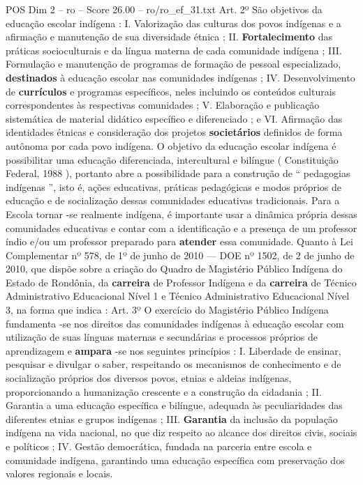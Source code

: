 \begin{textsample}{POS Dim 2 – ro – Score 26.00 – ro/ro\_ef\_31.txt}
Art. 2º São objetivos da educação escolar indígena : I.
Valorização das culturas dos povos indígenas e a afirmação e manutenção de sua diversidade étnica ; II. \textbf{Fortalecimento} das práticas socioculturais e da língua materna de cada comunidade indígena ; III.
Formulação e manutenção de programas de formação de pessoal especializado, \textbf{destinados} à educação escolar nas comunidades indígenas ; IV.
Desenvolvimento de \textbf{currículos} e programas específicos, neles incluindo os conteúdos culturais correspondentes às respectivas comunidades ; V.
Elaboração e publicação sistemática de material didático específico e diferenciado ; e VI.
Afirmação das identidades étnicas e consideração dos projetos \textbf{societários} definidos de forma autônoma por cada povo indígena.
O objetivo da educação escolar indígena é possibilitar uma educação diferenciada, intercultural e bilíngue ( Constituição Federal, 1988 ), portanto abre a possibilidade para a construção de “ pedagogias indígenas ”, isto é, ações educativas, práticas pedagógicas e modos próprios de educação e de socialização dessas comunidades educativas tradicionais.
Para a Escola tornar -se realmente indígena, é importante usar a dinâmica própria dessas comunidades educativas e contar com a identificação e a presença de um professor índio e/ou um professor preparado para \textbf{atender} essa comunidade.
Quanto à Lei Complementar nº 578, de 1º de junho de 2010 — DOE nº 1502, de 2 de junho de 2010, que dispõe sobre a criação do Quadro de Magistério Público Indígena do Estado de Rondônia, da \textbf{carreira} de Professor Indígena e da \textbf{carreira} de Técnico Administrativo Educacional Nível 1 e Técnico Administrativo Educacional Nível 3, na forma que indica : Art. 3º O exercício do Magistério Público Indígena fundamenta -se nos direitos das comunidades indígenas à educação escolar com utilização de suas línguas maternas e secundárias e processos próprios de aprendizagem e \textbf{ampara} -se nos seguintes princípios : I.
Liberdade de ensinar, pesquisar e divulgar o saber, respeitando os mecanismos de conhecimento e de socialização próprios dos diversos povos, etnias e aldeias indígenas, proporcionando a humanização crescente e a construção da cidadania ; II.
Garantia a uma educação específica e bilíngue, adequada às peculiaridades das diferentes etnias e grupos indígenas ; III. \textbf{Garantia} da inclusão da população indígena na vida nacional, no que diz respeito ao alcance dos direitos civis, sociais e políticos ; IV.
Gestão democrática, fundada na parceria entre escola e comunidade indígena, garantindo uma educação específica com preservação dos valores regionais e locais.

\end{textsample}
